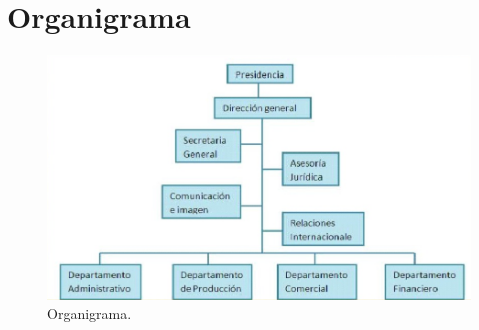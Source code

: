 \documentclass[12pt,letterpaper]{article}
\begin{document}
\newpage
\section{Organigrama}
\begin{figure}[ht]
    \centering
    \includegraphics[width=.8\textwidth]{imagenes/organigrama.png}
    \caption{Organigrama.}
\end{figure}

\newpage
\end{document}
